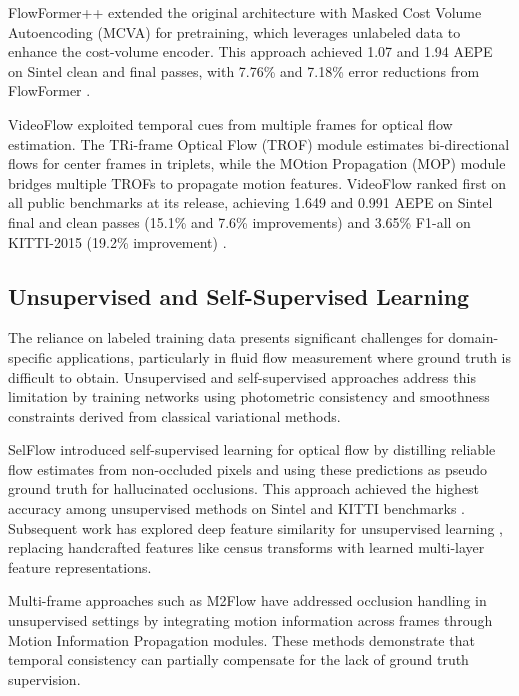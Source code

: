 FlowFormer++ \cite{shi2023flowformerpp} extended the original architecture with Masked Cost Volume Autoencoding (MCVA) for pretraining, which leverages unlabeled data to enhance the cost-volume encoder. This approach achieved 1.07 and 1.94 AEPE on Sintel clean and final passes, with 7.76\% and 7.18\% error reductions from FlowFormer \cite{shi2023flowformerpp}.

VideoFlow \cite{shi2023videoflow} exploited temporal cues from multiple frames for optical flow estimation. The TRi-frame Optical Flow (TROF) module estimates bi-directional flows for center frames in triplets, while the MOtion Propagation (MOP) module bridges multiple TROFs to propagate motion features. VideoFlow ranked first on all public benchmarks at its release, achieving 1.649 and 0.991 AEPE on Sintel final and clean passes (15.1\% and 7.6\% improvements) and 3.65\% F1-all on KITTI-2015 (19.2\% improvement) \cite{shi2023videoflow}.

\subsection{Unsupervised and Self-Supervised Learning}

The reliance on labeled training data presents significant challenges for domain-specific applications, particularly in fluid flow measurement where ground truth is difficult to obtain. Unsupervised and self-supervised approaches address this limitation by training networks using photometric consistency and smoothness constraints derived from classical variational methods.

SelFlow \cite{liu2019selflow} introduced self-supervised learning for optical flow by distilling reliable flow estimates from non-occluded pixels and using these predictions as pseudo ground truth for hallucinated occlusions. This approach achieved the highest accuracy among unsupervised methods on Sintel and KITTI benchmarks \cite{liu2019selflow}. Subsequent work has explored deep feature similarity for unsupervised learning \cite{liu2020unsupervised}, replacing handcrafted features like census transforms with learned multi-layer feature representations.

Multi-frame approaches such as M2Flow have addressed occlusion handling in unsupervised settings by integrating motion information across frames through Motion Information Propagation modules. These methods demonstrate that temporal consistency can partially compensate for the lack of ground truth supervision.

